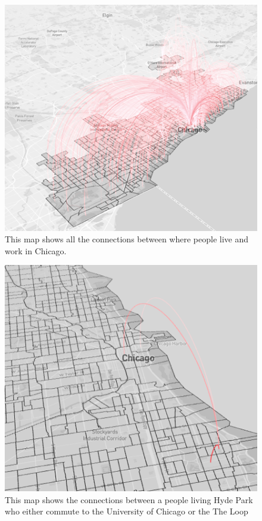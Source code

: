 \documentclass{article}
\theoremstyle{definition}
\theoremstyle{remark}
\begin{document}
\begin{figure}[H]
    \centering
    \includegraphics[width=1.0\textwidth]{arc-1}
    \caption{This map shows all the connections between where people live and work in Chicago.}
    \label{fig:arc-1}
\end{figure}

\begin{figure}[H]
    \centering
    \includegraphics[width=1.0\textwidth]{arc-2}
    \caption{This map shows the connections between a people living Hyde Park who either commute to the University of Chicago or the The Loop}
    \label{fig:arc-2}
\end{figure} \\
\end{document}
